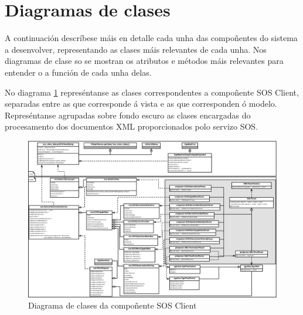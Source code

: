 \section{Diagramas de clases}
A continuación descríbese máis en detalle cada unha das compoñentes do sistema a desenvolver, representando as clases máis relevantes de cada unha. Nos diagramas de clase so se mostran os atributos e métodos máis relevantes para entender o a función de cada unha delas.

No diagrama \ref{fig:diaClassSOSClient} represéntanse as clases correspondentes a compoñente SOS Client, separadas entre as que corresponde á vista e as que corresponden ó modelo. Represéntanse agrupadas sobre fondo escuro as clases encargadas do procesamento dos documentos XML proporcionados polo servizo SOS.

\begin{figure}
 \centering
 \includegraphics[width=\textwidth]{images/clases_sos_client.eps}
 \caption{Diagrama de clases da compoñente SOS Client}
 \label{fig:diaClassSOSClient}
\end{figure}

